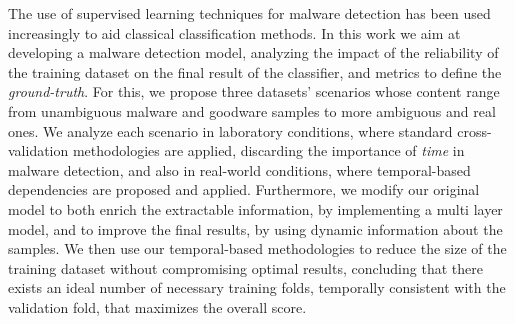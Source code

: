 
The use of supervised learning techniques for malware detection has been used increasingly to aid classical classification methods. 
In this work we aim at developing a malware detection model, analyzing the impact of the reliability of the training dataset on the final result of the classifier, and metrics to define the \emph{ground-truth}.
For this, we propose three datasets' scenarios whose content range from unambiguous malware and goodware samples to more ambiguous and real ones.
We analyze each scenario in laboratory conditions, where standard cross-validation methodologies are applied, discarding the importance of \emph{time} in malware detection, and also in real-world conditions, where temporal-based dependencies are proposed and applied.
Furthermore, we modify our original model to both enrich the extractable information, by implementing a multi layer model, and to improve the final results, by using dynamic information about the samples.
We then use our temporal-based methodologies to reduce the size of the training dataset without compromising optimal results, concluding that there exists an ideal number of necessary training folds, temporally consistent with the validation fold, that maximizes the overall score.